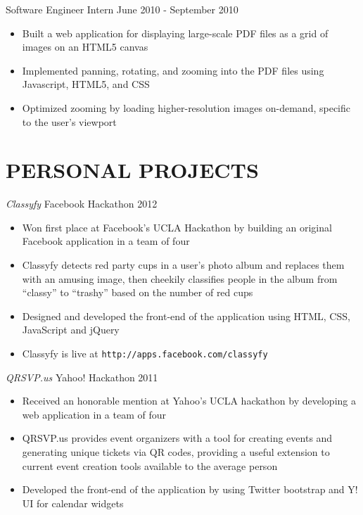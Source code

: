 \documentclass{res}
\begin{document}
\begin{resume}
 Software Engineer Intern \hfill    June 2010 - September 2010

   \begin{itemize} \itemsep -2pt
   \item Built a web application for displaying large-scale PDF files as a grid of images on an HTML5 canvas
   \item Implemented panning, rotating, and zooming into the PDF files using Javascript, HTML5, and CSS
	\item Optimized zooming by loading higher-resolution images on-demand, specific to the user's viewport
   \end{itemize} \vspace{-6pt}

\section{PERSONAL PROJECTS}
\vspace{8pt}

 {\sl Classyfy} \hfill Facebook Hackathon 2012
   \begin{itemize} \itemsep -2pt
   \item{Won first place at Facebook's UCLA Hackathon by building an original Facebook application in a team of four}
   \item Classyfy detects red party cups in a user's photo album and replaces them with an amusing image, then cheekily classifies people in the album from ``classy'' to ``trashy'' based on the number of red cups
    \item Designed and developed the front-end of the application using HTML, CSS, JavaScript and jQuery
	\item{Classyfy is live at \tt{http://apps.facebook.com/classyfy}}
    \end{itemize} \vspace{-6pt}

 {\sl QRSVP.us} \hfill Yahoo! Hackathon 2011
  \begin{itemize} \itemsep -2pt
  \item Received an honorable mention at Yahoo's UCLA hackathon by developing a web application in a team of four
  \item QRSVP.us provides event organizers with a tool for creating events and generating unique tickets via QR codes, providing a useful extension to current event creation tools available to the average person
  \item Developed the front-end of the application by using Twitter bootstrap and Y! UI for calendar widgets
  \end{itemize} \vspace{-6pt}


\end{resume}
\end{document}
